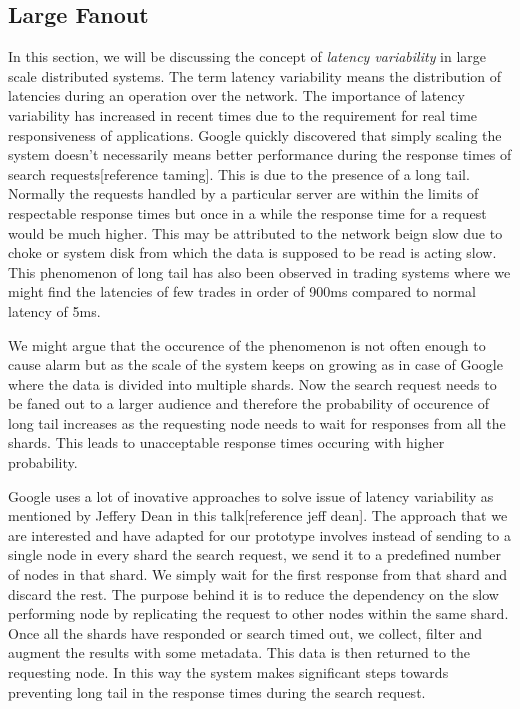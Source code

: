\documentclass[12pt,a4paper,twoside,openright]{book}
\begin{document}
\subsection{Large Fanout}
In this section, we will be discussing the concept of \textit{latency variability} in large scale distributed systems. The term latency variability means the distribution of latencies during an operation over the network. The importance of latency variability has increased in recent times due to the requirement for real time responsiveness of applications. Google quickly discovered that simply scaling the system doesn't necessarily means better performance during the response times of search requests[reference taming]. This is due to the presence of a long tail. Normally the requests handled by a particular server are within the limits of respectable response times but once in a while the response time for a request would be much higher. This may be attributed to the network beign slow due to choke or system disk from which the data is supposed to be read is acting slow. This phenomenon of long tail has also been observed in trading systems where we might find the latencies of few trades in order of 900ms compared to normal latency of 5ms. 

\par We might argue that the occurence of the phenomenon is not often enough to cause alarm but as the scale of the system keeps on growing as in case of Google where the data is divided into multiple shards. Now the search request needs to be faned out to a larger audience and therefore the probability of occurence of long tail increases as the requesting node needs to wait for responses from all the shards. This leads to unacceptable response times occuring with higher probability. 

\par Google uses a lot of inovative approaches to solve issue of latency variability as mentioned by Jeffery Dean in this talk[reference jeff dean]. The approach that we are interested and have adapted for our prototype involves instead of sending to a single node in every shard the search request, we send it to a predefined number of nodes in that shard. We simply wait for the first response from that shard and discard the rest. The purpose behind it is to reduce the dependency on the slow performing node by replicating the request to other nodes within the same shard. Once all the shards have responded or search timed out, we collect, filter and augment the results with some metadata. This data is then returned to the requesting node. In this way the system makes significant steps towards preventing long tail in the response times during the search request.
\end{document}
